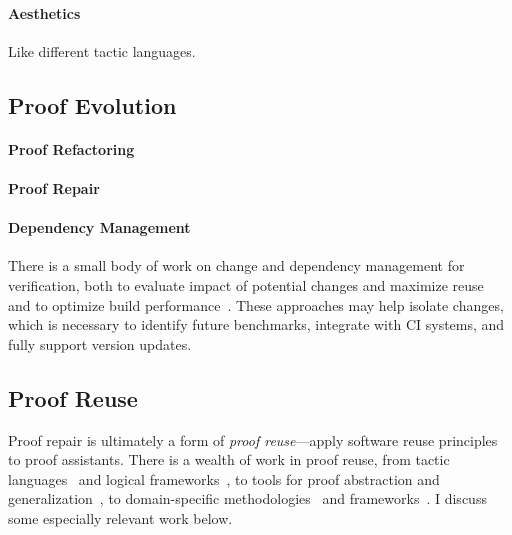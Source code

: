 \paragraph{Aesthetics} Like different tactic languages.

\subsection{Proof Evolution}
\label{sec:refrep}


\paragraph{Proof Refactoring}

\paragraph{Proof Repair}

\paragraph{Dependency Management}
There is a small body of work on change and dependency management for verification,
both to evaluate impact of potential changes and maximize reuse~\cite{873647, Autexier:2010:CMH:1986659.1986663}
and to optimize build performance~\cite{Celik:2017:IRP:3155562.3155588}.
These approaches may help isolate changes, which is necessary to identify future benchmarks, integrate
with CI systems, and fully support version updates.

\subsection{Proof Reuse}
\label{sec:reuse}

Proof repair is ultimately a form of \textit{proof reuse}---apply software reuse principles to proof assistants.
There is a wealth of work in proof reuse, from tactic languages~\cite{felty1994generalization} and logical frameworks~\cite{caplan1995logical},
to tools for proof abstraction and generalization~\cite{pons2000generalization, johnsen2004theorem},
to domain-specific methodologies~\cite{Delaware:2011:PLT:2048066.2048113} and frameworks~\cite{Delaware:2013:MLC:2429069.2429094}.
I discuss some especially relevant work below. %


